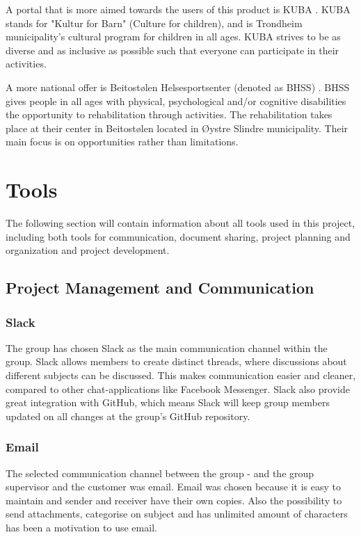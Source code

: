 A portal that is more aimed towards the users of this product is KUBA \cite{KUBA}. KUBA stands for "Kultur for Barn" (Culture for children), and is Trondheim municipality's cultural program for children in all ages. KUBA strives to be as diverse and as inclusive as possible such that everyone can participate in their activities.

A more national offer is Beitostølen Helsesportsenter (denoted as BHSS) \cite{BHSS}. BHSS gives people in all ages with physical, psychological and/or cognitive disabilities the opportunity to rehabilitation through activities. The rehabilitation takes place at their center in Beitostølen located in Øystre Slindre municipality. Their main focus is on opportunities rather than limitations.  

\section{Tools}
\label{tools}
The following section will contain information about all tools used in this project, including both tools for communication, document sharing, project planning and organization and project development.

\subsection{Project Management and Communication}

\subsubsection{Slack}
The group has chosen Slack \cite{Slack} as the main communication channel within the group. Slack allows members to create distinct threads, where discussions about different subjects can be discussed. This makes communication easier and cleaner, compared to other chat-applications like Facebook Messenger. Slack also provide great integration with GitHub, which means Slack will keep group members updated on all changes at the group's GitHub repository. 

\subsubsection{Email}
The selected communication channel between the group - and the group supervisor and the customer was email.
Email was chosen because it is easy to maintain and sender and receiver have their own copies. Also the possibility to send attachments, categorise on subject and has unlimited amount of characters has been a motivation to use email.  

